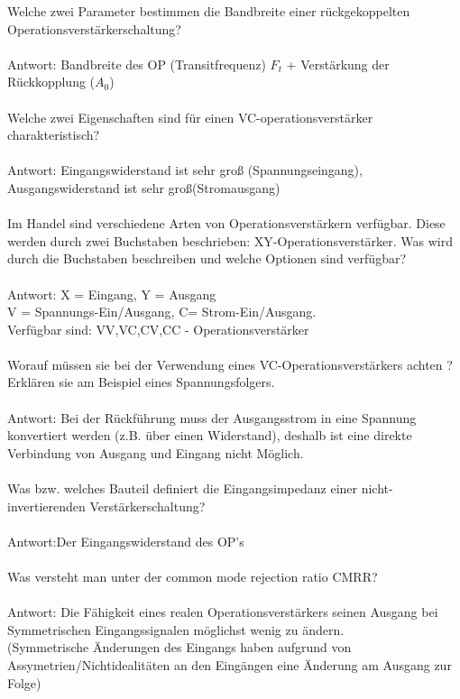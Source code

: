 \documentclass[A4]{scrartcl}
\begin{document}
  Welche zwei Parameter bestimmen die Bandbreite einer rückgekoppelten\\ 
  Operationsverstärkerschaltung?\\
  \\
  Antwort: Bandbreite des OP (Transitfrequenz) $F_t$ + Verstärkung der Rückkopplung ($A_0$)\\\\
  Welche zwei Eigenschaften sind für einen VC-operationsverstärker charakteristisch?\\
  \\
  Antwort: Eingangswiderstand ist sehr groß (Spannungseingang), Ausgangswiderstand ist sehr groß(Stromausgang)\\\\
  Im Handel sind verschiedene Arten von Operationsverstärkern verfügbar. Diese werden durch zwei Buchstaben beschrieben: XY-Operationsverstärker. Was wird durch die Buchstaben beschreiben und welche Optionen sind verfügbar?\\
  \\
  Antwort: X = Eingang, Y = Ausgang\\
  V = Spannungs-Ein/Ausgang, C= Strom-Ein/Ausgang.\\
  Verfügbar sind: VV,VC,CV,CC - Operationsverstärker \\\\
  Worauf müssen sie bei der Verwendung eines VC-Operationsverstärkers achten ? Erklären sie am Beispiel eines Spannungsfolgers.\\
  \\
  Antwort: Bei der Rückführung muss der Ausgangsstrom in eine Spannung konvertiert werden (z.B. über einen Widerstand), deshalb ist eine direkte Verbindung von Ausgang und Eingang nicht Möglich.\\\\
  Was bzw. welches Bauteil definiert die Eingangsimpedanz einer nicht-invertierenden Verstärkerschaltung?\\
  \\
  Antwort:Der Eingangswiderstand des OP's\\\\
  Was versteht man unter der common mode rejection ratio CMRR?\\
  \\
  Antwort: Die Fähigkeit eines realen Operationsverstärkers seinen Ausgang bei Symmetrischen Eingangssignalen möglichst wenig zu ändern.\\
  (Symmetrische Änderungen des Eingangs haben aufgrund von Assymetrien/Nichtidealitäten an den Eingängen eine Änderung am Ausgang zur Folge)\\
\end{document}
